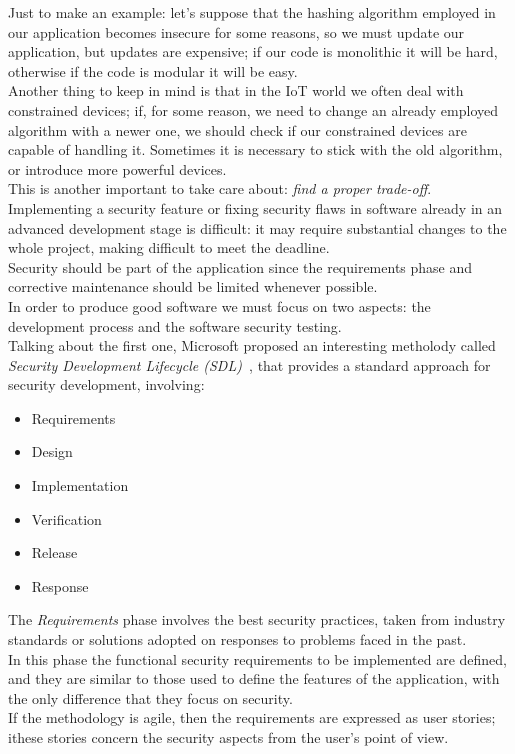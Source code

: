 \documentclass[12pt]{report}
\begin{document}
{Just to make an example:  let's suppose that the hashing algorithm employed in our application becomes insecure for some reasons, so we must update our application, but updates are expensive; if our code is monolithic it will be hard, otherwise if the code is modular it will be easy.\\

Another thing to keep in mind is that in the IoT world we often deal with constrained devices; if, for some reason, we need to change an already employed algorithm with a newer one, we should check if our constrained devices are capable of handling it. Sometimes it is necessary to stick with the old algorithm, or introduce more powerful devices.\\
This is another important to take care about: \emph{find a proper trade-off}.\\

Implementing a security feature or fixing security flaws in software already in an advanced development stage is difficult: it may require substantial changes to the whole project, making difficult to meet the deadline.\\
Security should be part of the application since the requirements phase and corrective maintenance should be limited whenever possible.\\

In order to produce good software we must focus on two aspects: the development process and the software security testing.\\
Talking about the first one, Microsoft proposed an interesting metholody called \emph{Security Development Lifecycle (SDL)~}, that provides a standard approach for security development, involving:

\begin{itemize}
\setlength{\itemindent}{+4mm}
  \item Requirements
  \item Design
  \item Implementation
  \item Verification
  \item Release
  \item Response
\end{itemize}

The \emph{Requirements} phase involves the best security practices, taken from industry standards or solutions adopted on responses to problems faced in the past.\\
In this phase the functional security requirements to be implemented are defined, and they are similar to those used to define the features of the application, with the only difference that they focus on security.\\
If the methodology is agile, then the requirements are expressed as user stories; ithese stories concern the security aspects from the user's point of view.\\

}
\end{document}
